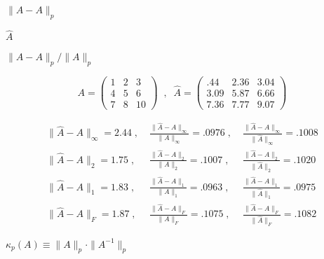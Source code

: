 {\newpage\clearpage
{}%
$\| \hat{A} - A \|_{p}$%
\lthtmlinlinemathZ
\lthtmlcheckvsize\clearpage}

{\newpage\clearpage
{}%
$\hat{A}$%
\lthtmlinlinemathZ
\lthtmlcheckvsize\clearpage}

{\newpage\clearpage
{}%
$\| \hat{A} - A \|_{p} / \| A \|_{p}$%
\lthtmlinlinemathZ
\lthtmlcheckvsize\clearpage}

{\newpage\clearpage
{}%
\begin{displaymath}
A = \left( \begin{array}{ccc} 1 & 2 & 3 \\4 & 5 & 6 \\7 & 8 & 10 \end{array} \right) \; \; , \; \;
\hat{A} = \left( \begin{array}{ccc} .44 & 2.36 & 3.04 \\3.09 & 5.87 & 6.66 \\7.36 & 7.77 & 9.07 \end{array} \right) 
\end{displaymath}%
\lthtmldisplayZ
\lthtmlcheckvsize\clearpage}

{\newpage\clearpage
{}%
\begin{eqnarray*}
\| \hat{A} - A \|_{\infty} = 2.44 \; , \;  & \displaystyle{
\frac{\| \hat{A} - A \|_{\infty}}{\| A \|_{\infty}} = .0976 }  \; , \;  &
\frac{\| \hat{A} - A \|_{\infty}}{\| \hat{A} \|_{\infty}} = .1008 \\
\| \hat{A} - A \|_{2} = 1.75 \; , \;  & \displaystyle{
\frac{\| \hat{A} - A \|_{2}}{\| A \|_{2}} = .1007 }  \; , \;  &
\frac{\| \hat{A} - A \|_{2}}{\| \hat{A} \|_{2}} = .1020 \\
\| \hat{A} - A \|_{1} = 1.83 \; , \;  & \displaystyle{
\frac{\| \hat{A} - A \|_{1}}{\| A \|_{1}} = .0963 }  \; , \;  &
\frac{\| \hat{A} - A \|_{1}}{\| \hat{A} \|_{1}} = .0975  \\
\| \hat{A} - A \|_{F} = 1.87 \; , \;  & \displaystyle{
\frac{\| \hat{A} - A \|_{F}}{\| A \|_{F}} = .1075 }  \; , \;  &
\frac{\| \hat{A} - A \|_{F}}{\| \hat{A} \|_{F}} = .1082
\end{eqnarray*}%
\lthtmldisplayZ
\lthtmlcheckvsize\clearpage}

{\newpage\clearpage
{}%
$\kappa_p (A) \equiv \|A\|_p \cdot \|A^{-1}\|_p$%
\lthtmlinlinemathZ
\lthtmlcheckvsize\clearpage}

